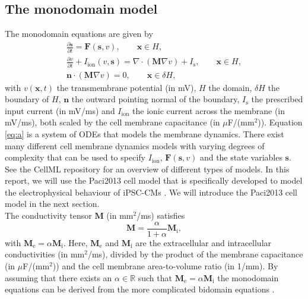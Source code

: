 \documentclass{article}
\begin{document}
\subsection{The monodomain model} \label{The monodomain model}
The monodomain equations are given by 
\begin{eqnarray} \label{eq:a}
\frac{\partial \mathbf{s}}{\partial t}= \mathbf{F}(\mathbf{s},v), \qquad \mathbf{x} \in H, \\
\frac{\partial v}{\partial t} + I_{\mathrm{ion}}(v,\mathbf{s}) =\nabla \label{eq:b} \cdot(\mathbf{M}\nabla v) + I_{\mathrm{s}},\qquad \mathbf{x} \in H, \\ \label{eq:c}
\mathbf{n}\cdot (\mathbf{M}\nabla v)=0, \qquad \mathbf{x} \in \delta H,
\end{eqnarray}
with $v(\mathbf{x},t)$ the transmembrane potential (in mV), $H$ the domain, $\delta H$ the boundary of $H$, $\mathbf{n}$ the outward pointing normal of the boundary,  $I_{\mathrm{s}}$ the prescribed input current (in mV/ms) and $I_{\mathrm{ion}}$ the ionic current across the membrane (in mV/ms), both scaled by the cell membrane capacitance (in $\mu$F/(mm$^2$)). 
Equation \eqref{eq:a} is a system of ODEs that models the membrane dynamics. There exist many different cell membrane dynamics models with varying degrees of complexity that can be used to specify $I_{\mathrm{ion}}$, $\mathbf{F}(\mathbf{s},v)$ and the state variables $\mathbf{s}$. See the CellML repository \cite{cellml, cellml2} for an overview of different types of models. In this report, we will use the Paci2013 cell model that is specifically developed to model the electrophysical behaviour of iPSC-CMs \cite{Paci2013}. We will introduce the Paci2013 cell model in the next section.\\ The conductivity tensor $\mathbf{M}$ (in mm$^2$/ms) satisfies 
\begin{equation}
\mathbf{M}=\frac{\alpha}{1+\alpha}\mathbf{M}_{\mathrm{i}},\label{eq:d}
\end{equation}
with $\mathbf{M}_{\mathrm{e}}=\alpha \mathbf{M}_{\mathrm{i}}$. Here, $\mathbf{M}_{\mathrm{e}}$ and $\mathbf{M}_{\mathrm{i}}$ are the extracellular and intracellular conductivities (in mm$^2$/ms), divided by the product of the membrane capacitance (in $\mu$F/(mm$^2$)) and the cell membrane area-to-volume ratio (in 1/mm). By assuming that there exists an $\alpha \in \mathbb{R}$ such that $\mathbf{M}_{\mathrm{e}}=\alpha \mathbf{M}_{\mathrm{i}}$ the monodomain equations can be derived from the more complicated bidomain equations \cite[p. 566-568]{KeenerI}.
%
\end{document}
